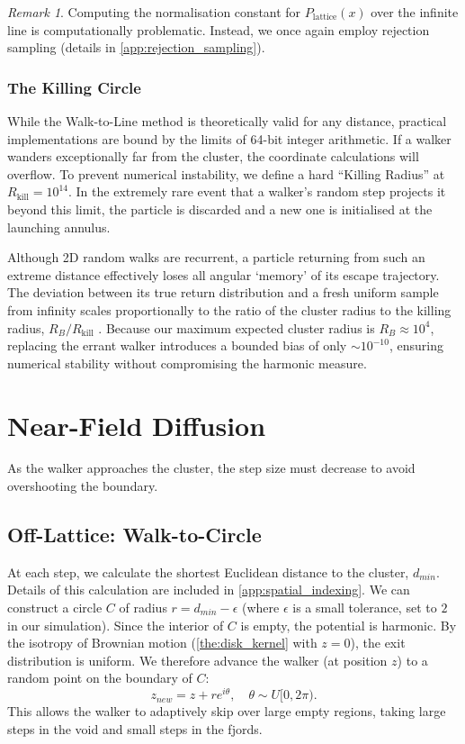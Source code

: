 \documentclass[12pt, a4paper, oneside]{report}
\theoremstyle{remark}
\newtheorem{remark}[theorem]{Remark}
\begin{document}
\begin{remark}
Computing the normalisation constant for $P_{\text{lattice}}(x)$ over the infinite line is computationally problematic. Instead, we once again employ rejection sampling (details in \cref{app:rejection_sampling}).
\end{remark}

\subsubsection{The Killing Circle}
While the Walk-to-Line method is theoretically valid for any distance, practical implementations are bound by the limits of 64-bit integer arithmetic. If a walker wanders exceptionally far from the cluster, the coordinate calculations will overflow. To prevent numerical instability, we define a hard ``Killing Radius'' at $R_{\text{kill}} = 10^{14}$. In the extremely rare event that a walker's random step projects it beyond this limit, the particle is discarded and a new one is initialised at the launching annulus.

Although 2D random walks are recurrent, a particle returning from such an extreme distance effectively loses all angular `memory' of its escape trajectory. The deviation between its true return distribution and a fresh uniform sample from infinity scales proportionally to the ratio of the cluster radius to the killing radius, $R_B / R_{\text{kill}}$ \cite{Loh2014}. Because our maximum expected cluster radius is $R_B \approx 10^4$, replacing the errant walker introduces a bounded bias of only $\sim 10^{-10}$, ensuring numerical stability without compromising the harmonic measure.
\section{Near-Field Diffusion}
\label{sec:near_field}
As the walker approaches the cluster, the step size must decrease to avoid overshooting the boundary. 

\subsection{Off-Lattice: Walk-to-Circle}
At each step, we calculate the shortest Euclidean distance to the cluster, $d_{min}$. Details of this calculation are included in \cref{app:spatial_indexing}. We can construct a circle $C$ of radius $r = d_{min} - \epsilon$ (where $\epsilon$ is a small tolerance, set to $2$ in our simulation). Since the interior of $C$ is empty, the potential is harmonic.
By the isotropy of Brownian motion (\cref{the:disk_kernel} with $z=0$), the exit distribution is uniform. We therefore advance the walker (at position $z$) to a random point on the boundary of $C$:
\begin{equation*}
    z_{new} = z + r e^{i\theta}, \quad \theta \sim U[0, 2\pi).
\end{equation*}
This allows the walker to adaptively skip over large empty regions, taking large steps in the void and small steps in the fjords.
\end{document}

